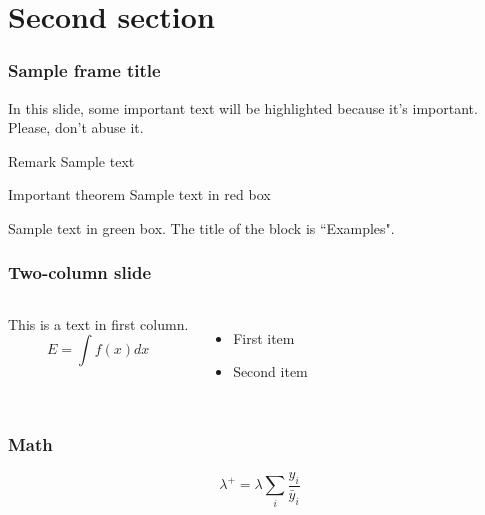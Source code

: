 \documentclass[8pt,aspectratio=169,xcolor=dvipsnames]{beamer} %
\begin{document}
\section{Second section}

\begin{frame}
\frametitle{Sample frame title}

In this slide, some important text will be
\alert{highlighted} because it's important.
Please, don't abuse it.

\begin{block}{Remark}
Sample text
\end{block}

\begin{alertblock}{Important theorem}
Sample text in red box
\end{alertblock}

\begin{examples}
Sample text in green box. The title of the block is ``Examples".
\end{examples}
\end{frame}


\begin{frame}
\frametitle{Two-column slide}

\begin{columns}

This is a text in first column.
$$E=\int f(x) dx$$
\begin{itemize}
\item First item
\item Second item
\end{itemize}


\begin{center}
\resizebox{0.95\columnwidth}{!} {%
  
}
\end{center}

\end{columns}
\end{frame}

\begin{frame}
\frametitle{Math}

\begin{equation}
    \lambda^+ = \lambda \sum_i \frac{y_i}{\bar{y}_i}
\end{equation}

\end{frame}
\end{document}
